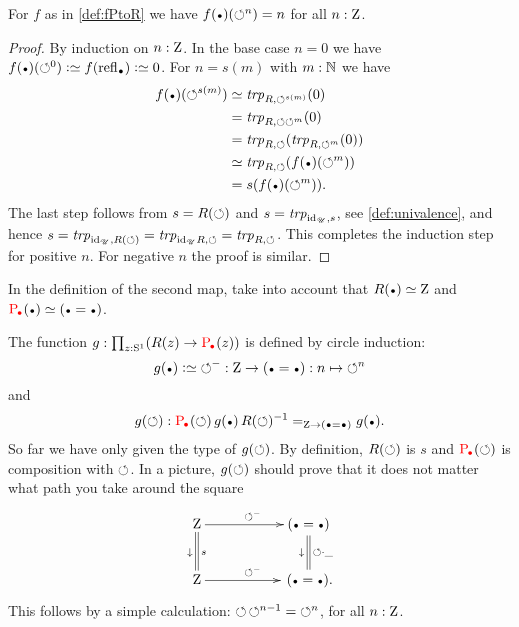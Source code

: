 \begin{lemma}\label{lem:windingnumber}
For $f$ as in \cref{def:fPtoR} we have $f(\base)(\Sloop^n)=n$ for all $n:\mathrm{Z}$.
\end{lemma}
\begin{proof}
By induction on $n:\mathrm{Z}$.  In the base case $n=0$ we have
$f(\base)(\Sloop^0)\defeq f(\refl\base)\defeq 0$.
For $n=s(m)$ with $m:\mathbb{N}$ we have
\begin{align*}
  f(\base)(\Sloop^{s(m)})&\jdeq\trp[R]{\Sloop^{s(m)}}(0)\\
  &=\trp[R]{\Sloop \Sloop^{m}}(0)\\
  &=\trp[R]{\Sloop}(\trp[R]{\Sloop^m}(0))\\
  &\jdeq \trp[R]{\Sloop}(f(\base)(\Sloop^{m}))\\
  &= s(f(\base)(\Sloop^{m})).
\end{align*}
The last step follows from ${s}=R(\circlearrowleft)$ 
and $s=\trp[\id_\UU]{\etop{s}}$, see \cref{def:univalence},
and hence $s=\trp[\id_\UU]{R(\Sloop)}=\trp[\id_\UU R]{\Sloop}=\trp[R]{\Sloop}$. 
This completes the induction step for positive $n$.
For negative $n$ the proof is similar.
\end{proof}

In the definition of the second map, 
take into account that $R(\base)\jdeq \zet$ and $\uc{\base}(\base) \jdeq (\base=\base)$.

\begin{definition}\label{def:gRtoP}
The function $g:\prod_{z:\Sc}(R(z)\to \uc{\base}(z))$ is 
defined by circle induction: 
\[
g(\base)\defeq {\Sloop^{-}}:\zet\to(\base=\base) : n \mapsto {\Sloop^n}
\]
and 
\[
g(\Sloop): \uc{\base}(\Sloop)\, g(\base)\,R(\Sloop)^{-1}=_{\zet\to (\base=\base)} g(\base).
\]
So far we have only given the type of $g(\circlearrowleft)$. By definition, $R(\circlearrowleft)$ is $s$
and $\uc{\base}(\Sloop)$ is composition with $\circlearrowleft$.
In a picture, $g(\circlearrowleft)$ should prove that it does not matter what 
path you take around the square
$$\xymatrix{\zet\ar[rr]^{\Sloop^-}\ar@{=}[d]^s_\downarrow
 &&(\base=\base)\ar@{=}[d]^{\Sloop\cdot\_}_\downarrow\\
  \zet\ar[rr]^{\Sloop^-}&&\,(\base=\base).}
$$
This follows by a simple calculation: ${\circlearrowleft\,\circlearrowleft^{n-1}} = {\circlearrowleft^n}$, 
for all $n:\mathrm{Z}$. 
\end{definition}


